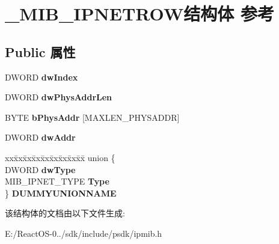 \hypertarget{struct___m_i_b___i_p_n_e_t_r_o_w}{}\section{\+\_\+\+M\+I\+B\+\_\+\+I\+P\+N\+E\+T\+R\+O\+W结构体 参考}
\label{struct___m_i_b___i_p_n_e_t_r_o_w}
\subsection*{Public 属性}
\begin{DoxyCompactItemize}
\item 
\mbox{\label{struct___m_i_b___i_p_n_e_t_r_o_w_a7c8bb3647b2bad2fb3ce4ebb0c5aa8ed}} 
D\+W\+O\+RD {\bfseries dw\+Index}
\item 
\mbox{\label{struct___m_i_b___i_p_n_e_t_r_o_w_a019b8d151bd35e537db50a1f59844520}} 
D\+W\+O\+RD {\bfseries dw\+Phys\+Addr\+Len}
\item 
\mbox{\label{struct___m_i_b___i_p_n_e_t_r_o_w_a1db4cf668bf708d2843424000fd49440}} 
B\+Y\+TE {\bfseries b\+Phys\+Addr} \mbox{[}M\+A\+X\+L\+E\+N\+\_\+\+P\+H\+Y\+S\+A\+D\+DR\mbox{]}
\item 
\mbox{\label{struct___m_i_b___i_p_n_e_t_r_o_w_a5b481369f97ca8e4fcf09099ba920722}} 
D\+W\+O\+RD {\bfseries dw\+Addr}
\item 
\mbox{\label{struct___m_i_b___i_p_n_e_t_r_o_w_a1bcd40573739912f7ec712aa44f689c1}} 
\begin{tabbing}
xx\=xx\=xx\=xx\=xx\=xx\=xx\=xx\=xx\=\kill
union \{\\
\>DWORD {\bfseries dwType}\\
\>MIB\_IPNET\_TYPE {\bfseries Type}\\
\} {\bfseries DUMMYUNIONNAME}\\

\end{tabbing}\end{DoxyCompactItemize}


该结构体的文档由以下文件生成\+:\begin{DoxyCompactItemize}
\item 
E\+:/\+React\+O\+S-\/0../sdk/include/psdk/ipmib.\+h\end{DoxyCompactItemize}
